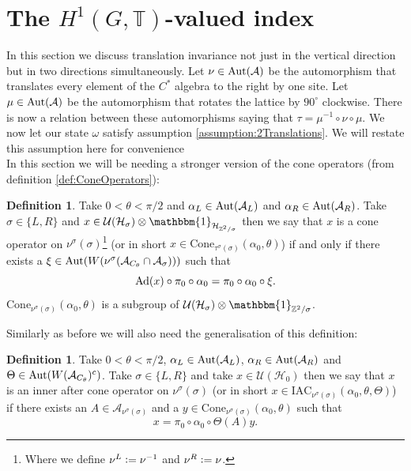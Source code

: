 \documentclass[12pt,a4paper,twoside]{article}
\newcommand{\defeq}{\vcentcolon=}
\let\originalleft\left
\let\originalright\right
\renewcommand{\left}{\mathopen{}\mathclose\bgroup\originalleft}
\renewcommand{\right}{\aftergroup\egroup\originalright}
\newcommand{\UU}{\mathcal U}
\newcommand{\HH}{\mathcal H}
\newcommand{\ZZ}{\mathbb Z}
\newcommand{\TT}{\mathbb T}
\renewcommand{\AA}{\mathcal A}
\newcommand{\id}{\mathbbm{1}}
\newcommand{\Ad}[1]{\textrm{Ad}\left(#1\right)}
\newcommand{\Aut}[1]{\textrm{Aut}\left(#1\right)}
\theoremstyle{definition}
\newtheorem{definition}[theorem]{Definition}
\numberwithin{equation}{section}
\begin{document}
\section{The $H^1(G,\TT)$-valued index}\label{sec:TwoDirectionTraslationInvariance}
In this section we discuss translation invariance not just in the vertical direction but in two directions simultaneously. Let $\nu\in\Aut{\AA}$ be the automorphism that translates every element of the $C^*$ algebra to the right by one site. Let $\mu\in\Aut{\AA}$ be the automorphism that rotates the lattice by $90^\circ$ clockwise. There is now a relation between these automorphisms saying that $\tau=\mu^{-1}\circ\nu\circ\mu$. We now let our state $\omega$ satisfy assumption \ref{assumption:2Translations}. We will restate this assumption here for convenience
\assumptionTwo*$\:$\\
In this section we will be needing a stronger version of the cone operators (from definition \ref{def:ConeOperators}):
\begin{definition}
	Take $0<\theta<\pi/2$ and $\alpha_L\in\Aut{\AA_{L}}$ and $\alpha_R\in\Aut{\AA_{R}}$. Take $\sigma\in\{L,R\}$ and $x\in\UU(\HH_{\sigma})\otimes\id_{\HH_{\ZZ^2/\sigma}}$ then we say that $x$ is a cone operator on $\nu^\sigma(\sigma)$\footnote{Where we define $\nu^L\defeq \nu^{-1}$ and $\nu^R\defeq \nu$.} (or in short $x\in\textrm{Cone}_{\tau^\sigma(\sigma)}(\alpha_0,\theta)$) if and only if there exists a $\xi\in\Aut{W(\nu^\sigma(\AA_{C_\theta}\cap\AA_\sigma))}$ such that
	\begin{equation}
		\Ad{x}\circ\pi_0\circ\alpha_0=\pi_0\circ\alpha_0\circ\xi.
	\end{equation}
	$\textrm{Cone}_{\nu^\sigma(\sigma)}(\alpha_0,\theta)$ is a subgroup of $\UU(\HH_\sigma)\otimes\id_{\ZZ^2/\sigma}$.
\end{definition}
Similarly as before we will also need the generalisation of this definition:
\begin{definition}
	Take $0<\theta<\pi/2$, $\alpha_L\in\Aut{\AA_{L}}$, $\alpha_R\in\Aut{\AA_{R}}$ and $\Theta\in\Aut{W(\AA_{C_\theta})^c}$. Take $\sigma\in\{L,R\}$ and take $x\in\UU(\HH_0)$ then we say that $x$ is an inner after cone operator on $\nu^\sigma(\sigma)$ (or in short $x\in \textrm{IAC}_{\nu^\sigma(\sigma)}(\alpha_0,\theta,\Theta)$) if there exists an $A\in\AA_{\nu^\sigma(\sigma)}$ and a $y\in\textrm{Cone}_{\nu^\sigma(\sigma)}(\alpha_0,\theta)$ such that
	\begin{equation}
		x=\pi_0\circ\alpha_0\circ\Theta(A)y.
	\end{equation}
\end{definition}
\end{document}
